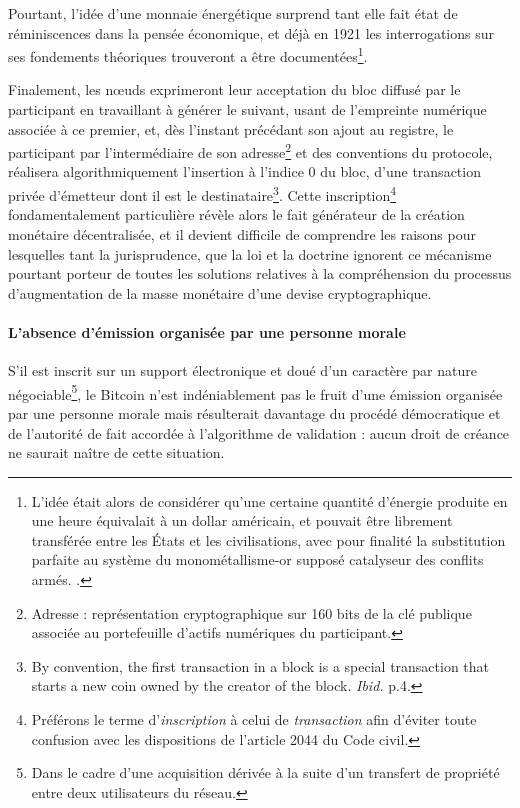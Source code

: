 {Pourtant, l'idée d'une monnaie énergétique surprend tant elle fait état de réminiscences dans la pensée économique, et déjà en 1921 les interrogations sur ses fondements théoriques trouveront a être documentées\footnote{L'idée était alors de considérer qu'une certaine quantité d'énergie produite en une heure équivalait à un dollar américain, et pouvait être librement transférée entre les États et les civilisations, avec pour finalité la substitution parfaite au système du monométallisme-or supposé catalyseur des conflits armés. .}.\par
Finalement, les n\oe{}uds exprimeront leur acceptation du bloc diffusé par le participant en travaillant à générer le suivant, usant de l'empreinte numérique associée à ce premier, et, dès l'instant précédant son ajout au registre, le participant par l'intermédiaire de son adresse\footnote{Adresse : représentation cryptographique sur 160 bits de la clé publique associée au portefeuille d'actifs numériques du participant.} et des conventions du protocole, réalisera algorithmiquement l'insertion à l'indice 0 du bloc, d'une transaction privée d'émetteur dont il est le destinataire\footnote{\og By convention, the first transaction in a block is a special transaction that starts a new coin owned by the creator of the block\fg. \emph{Ibid.} p.4.}. Cette inscription\footnote{Préférons le terme d'\emph{inscription} à celui de \emph{transaction} afin d'éviter toute confusion avec les dispositions de l'article 2044 du Code civil.} fondamentalement particulière révèle alors le fait générateur de la création monétaire décentralisée, et il devient difficile de comprendre les raisons pour lesquelles tant la jurisprudence, que la loi et la doctrine ignorent ce mécanisme pourtant porteur de toutes les solutions relatives à la compréhension du processus d'augmentation de la masse monétaire d'une devise cryptographique.

\paragraph{L'absence d'émission organisée par une personne morale}

 S'il est inscrit sur un support électronique et doué d'un caractère par nature négociable\footnote{Dans le cadre d'une acquisition dérivée à la suite d'un transfert de propriété entre deux utilisateurs du réseau.}, le Bitcoin n'est indéniablement pas le fruit d'une émission organisée par une personne morale mais résulterait davantage du procédé démocratique et de l'autorité de fait accordée à l'algorithme de validation : aucun droit de créance ne saurait naître de cette situation.\par
 
}
